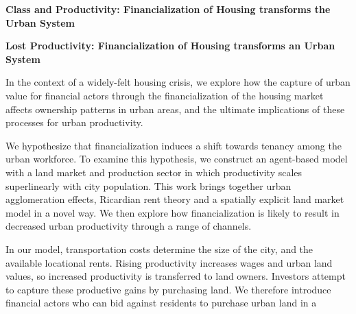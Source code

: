 \begin{center}\textbf{Class and  Productivity: Financialization of Housing transforms the Urban System}\end{center}
\begin{center}\textbf{Lost Productivity: Financialization of Housing transforms an Urban System}\end{center}

In the context of a widely-felt housing crisis, we explore how the capture of urban value for financial actors through the financialization of the housing market affects ownership patterns in urban areas, and the ultimate implications of these processes for urban productivity.


We hypothesize that financialization induces a shift towards tenancy among the urban workforce. To examine this hypothesis, we construct an agent-based model with a land market and production sector in which productivity scales superlinearly with city population. This work brings together urban agglomeration effects, Ricardian rent theory and a spatially explicit land market model in a novel way. 
We then explore how financialization is likely to result in decreased urban productivity through a range of channels. 


In our model, transportation costs determine the size of the city, and the available locational rents. Rising productivity increases wages and urban land values, so increased productivity is transferred to land owners. Investors attempt to capture these productive gains by purchasing land. %
We therefore introduce financial actors who can bid against residents to purchase urban land in a %

